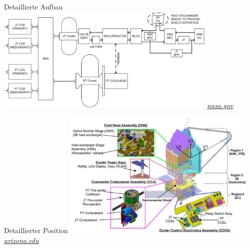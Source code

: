 \documentclass[aspectratio=1610, 9pt, xcolor=dvipsnames]{beamer}
\begin{document}
\begin{frame}{Detaillierte Aufbau}
  \centering
  \includegraphics[width=0.8\textwidth]{Plots/diagramm.png}
  \hspace*{12pt}\hbox{\scriptsize {\footnotesize\itshape \href{https://www2.jpl.nasa.gov/adv_tech/coolers/Pub.htm}
  {nasa.gov}}}
\end{frame}
\begin{frame}{Detaillierter Position}
  \centering
  \includegraphics[width=0.7\textwidth]{Plots/realer_Aufbau.png}
  \hspace*{12pt}\hbox{\scriptsize {\footnotesize\itshape \href{http://ircamera.as.arizona.edu/MIRI/}
  {arizona.edu}}}
\end{frame}
\end{document}
